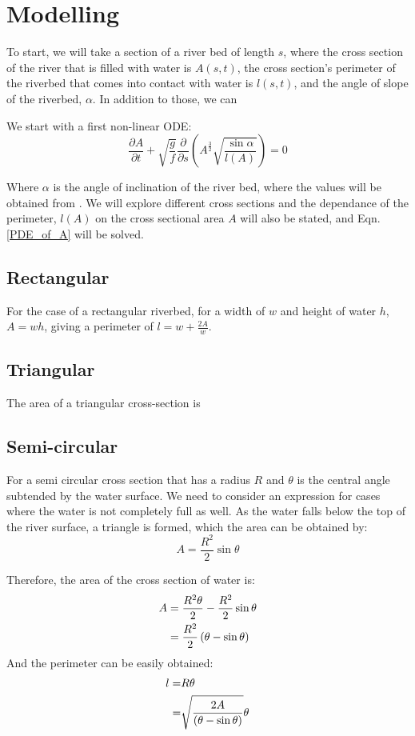 \documentclass[12pt]{article}
\begin{document}
\section{Modelling}
To start, we will take a section of a river bed of length $s$, where the cross section of the river that is filled with water is $A(s, t)$, the cross section's perimeter of the riverbed that comes into contact with water is $l(s, t)$, and the angle of slope of the riverbed, $\alpha$. In addition to those, we can 


We start with a first non-linear ODE:
\begin{equation}
\label{PDE_of_A}
    \frac{\partial A}{\partial t} + \sqrt{\frac{g}{f}} \frac{\partial}{\partial s}\left(A^{\frac{3}{2}}\sqrt{\frac{\sin \alpha}{l (A)}}\right) = 0
\end{equation}

Where $\alpha$ is the angle of inclination of the river bed, where the values will be obtained from \cite{ROSGEN1994169}. We will explore different cross sections and the dependance of the perimeter, $l(A)$ on the cross sectional area $A$ will also be stated, and Eqn. \ref{PDE_of_A} will be solved.

\subsection{Rectangular}
For the case of a rectangular riverbed, for a width of $w$ and height of water $h$, $A = wh$, giving a perimeter of $l = w + \frac{2A}{w}$.

\subsection{Triangular}
The area of a triangular cross-section is 


\subsection{Semi-circular}
For a semi circular cross section that has a radius $R$ and $\theta$ is the central angle subtended by the water surface. We need to consider an expression for cases where the water is not completely full as well. As the water falls below the top of the river surface, a triangle is formed, which the area can be obtained by:
\begin{equation}
    A = \frac{R^2}{2} \sin\theta
\end{equation}

Therefore, the area of the cross section of water is:
\begin{align}
    A &=\frac{R^2 \theta}{2} - \frac{R^2}{2}\sin\theta \\
      &= \frac{R^2}{2}\left(\theta - \sin\theta\right) \notag
\end{align}
And the perimeter can be easily obtained:
\begin{align}
    l =& R\theta \\
        =& \sqrt{\frac{2A}{\left(\theta - \sin\theta\right)}}\theta \notag
\end{align}
\end{document}
